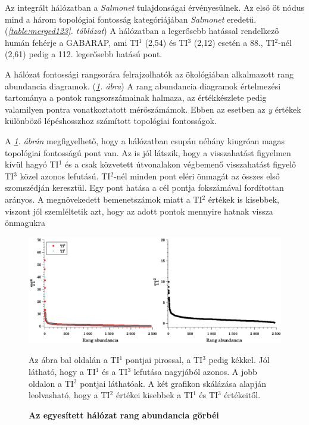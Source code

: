 \documentclass[a4paper,12pt]{article}
\newenvironment{imgdesc}{
		\small
		\singlespacing
		\begin{center}
		
	}{
		\end{center}	
	}
\begin{document}
			Az integrált hálózatban a \textit{Salmonet} tulajdonságai érvényesülnek. Az első öt nódus mind a három topológiai fontosság kategóriájában \textit{Salmonet} eredetű. (\textit{\ref{table:merged123}. táblázat})  A hálózatban a legerősebb hatással rendelkező humán fehérje a GABARAP, ami TI$^1$ (2,54) és TI$^3$ (2,12) esetén a 88., TI$^2$-nél (2,61) pedig a 112. legerősebb hatású pont.   
			
			A hálózat fontossági rangsorára felrajzolhatók az ökológiában alkalmazott rang abundancia diagramok.  (\textit{\ref{fig:mergedTIs}. ábra}) A rang abundancia diagramok értelmezési tartománya a pontok rangsorszámainak halmaza, az értékkészlete pedig valamilyen pontra vonatkoztatott mérőszámámok. Ebben az esetben az \textit{y} értékek különböző lépéshosszhoz számított topológiai fontosságok.
			
			A \textit{\ref{fig:mergedTIs}. ábrán} megfigyelhető, hogy a hálózatban csupán néhány kiugróan magas topológiai fontosságú pont van. Az is jól látszik, hogy a visszahatást figyelmen kívül hagyó TI$^1$ és a csak közvetett útvonalakon végbemenő visszahatást figyelő TI$^3$ közel azonos lefutású. TI$^2$-nél minden pont eléri önmagát az összes első szomszédján keresztül. Egy pont hatása a cél pontja fokszámával fordítottan arányos. A megnövekedett bemenetszámok miatt a TI$^2$ értékek is kisebbek, viszont jól szemléltetik azt, hogy az adott pontok mennyire hatnak vissza önmagukra			
			
						\begin{figure}[H]
							\includegraphics[scale=0.5]{img/mergedTIs.pdf}
							\centering
							\caption{\textbf{ Az egyesített hálózat rang abundancia görbéi}}
							\begin{imgdesc}
								Az ábra bal oldalán a TI$^1$ pontjai pirossal, a TI$^3$ pedig kékkel. Jól látható, hogy a TI$^1$ és a TI$^3$ lefutása nagyjából azonos. A jobb oldalon a TI$^2$ pontjai láthatóak. A két grafikon skálázása alapján leolvasható, hogy a TI$^2$ értékei kisebbek a TI$^1$ és TI$^3$ értékeitől.
							\end{imgdesc}
				
							\label{fig:mergedTIs}			 		 
						\end{figure}
			
\end{document}
